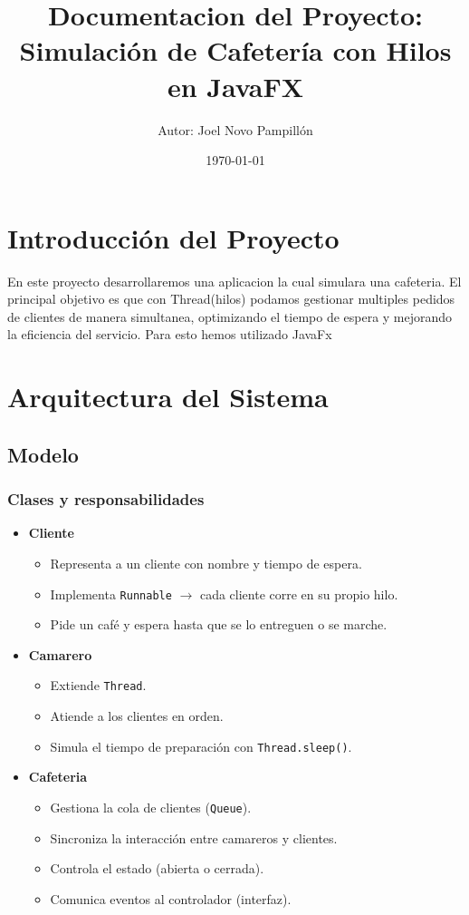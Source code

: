 \documentclass[12pt,a4paper]{article}
\title{Documentacion del Proyecto: Simulación de Cafetería con Hilos en JavaFX}
\author{Autor: Joel Novo Pampillón}
\date{\today}
\begin{document}
\maketitle

\section*{Introducción del Proyecto}
En este proyecto desarrollaremos una aplicacion la cual simulara una cafeteria. El principal objetivo es que con Thread(hilos) podamos gestionar multiples pedidos de clientes de manera simultanea, optimizando el tiempo de espera y mejorando la eficiencia del servicio.
Para esto hemos utilizado JavaFx

\section{Arquitectura del Sistema}

\subsection{Modelo}


\subsubsection*{Clases y responsabilidades}

\begin{itemize}
    \item \textbf{Cliente}
    \begin{itemize}
        \item Representa a un cliente con nombre y tiempo de espera.
        \item Implementa \texttt{Runnable} $\rightarrow$ cada cliente corre en su propio hilo.
        \item Pide un café y espera hasta que se lo entreguen o se marche.
    \end{itemize}

    \item \textbf{Camarero}
    \begin{itemize}
        \item Extiende \texttt{Thread}.
        \item Atiende a los clientes en orden.
        \item Simula el tiempo de preparación con \texttt{Thread.sleep()}.
    \end{itemize}

    \item \textbf{Cafeteria}
    \begin{itemize}
        \item Gestiona la cola de clientes (\texttt{Queue}).
        \item Sincroniza la interacción entre camareros y clientes.
        \item Controla el estado (abierta o cerrada).
        \item Comunica eventos al controlador (interfaz).
    \end{itemize}
\end{itemize}
\end{document}
